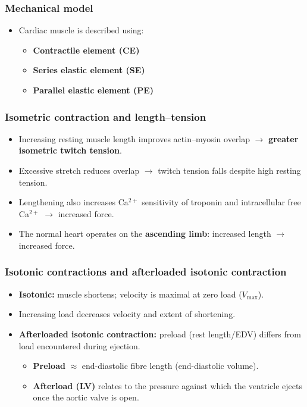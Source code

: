 \documentclass[11pt,a4paper]{article}
\begin{document}
\subsubsection{Mechanical model}
\begin{itemize}
\item Cardiac muscle is described using:
  \begin{itemize}
  \item \textbf{Contractile element (CE)}
  \item \textbf{Series elastic element (SE)}
  \item \textbf{Parallel elastic element (PE)}
  \end{itemize}
\end{itemize}

\subsubsection{Isometric contraction and length--tension}
\begin{itemize}
\item Increasing resting muscle length improves actin--myosin overlap $\rightarrow$ \textbf{greater isometric twitch tension}.
\item Excessive stretch reduces overlap $\rightarrow$ twitch tension falls despite high resting tension.
\item Lengthening also increases Ca$^{2+}$ sensitivity of troponin and intracellular free Ca$^{2+}$ $\rightarrow$ increased force.
\item The normal heart operates on the \textbf{ascending limb}: increased length $\rightarrow$ increased force.
\end{itemize}

\subsubsection{Isotonic contractions and afterloaded isotonic contraction}
\begin{itemize}
\item \textbf{Isotonic:} muscle shortens; velocity is maximal at zero load (\textbf{$V_{\max}$}).
\item Increasing load decreases velocity and extent of shortening.
\item \textbf{Afterloaded isotonic contraction:} preload (rest length/EDV) differs from load encountered during ejection.
  \begin{itemize}
  \item \textbf{Preload} $\approx$ end-diastolic fibre length (end-diastolic volume).
  \item \textbf{Afterload (LV)} relates to the pressure against which the ventricle ejects once the aortic valve is open.
  \end{itemize}
\end{itemize}
\end{document}
